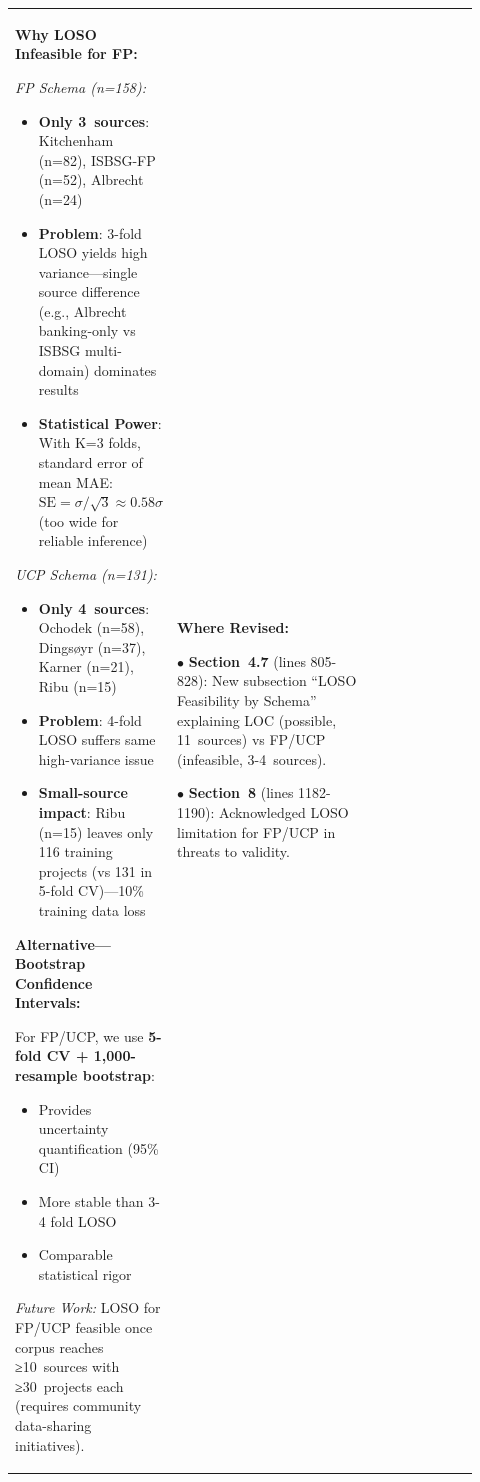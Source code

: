 \documentclass[11pt,a4paper]{article}
\begin{document}
\begin{longtable}{>{\raggedright\arraybackslash}p{0.26\linewidth}|>{\raggedright\arraybackslash}p{0.44\linewidth}|>{\raggedright\arraybackslash}p{0.22\linewidth}}
\textbf{Why LOSO Infeasible for FP:}

\textit{FP Schema (n=158):}
\begin{itemize}
    \item \textbf{Only 3~sources}: Kitchenham (n=82), ISBSG-FP (n=52), Albrecht (n=24)
    \item \textbf{Problem}: 3-fold LOSO yields high variance---single source difference (e.g., Albrecht banking-only vs ISBSG multi-domain) dominates results
    \item \textbf{Statistical Power}: With K=3 folds, standard error of mean MAE: $\text{SE} = \sigma/\sqrt{3} \approx 0.58\sigma$ (too wide for reliable inference)
\end{itemize}

\textit{UCP Schema (n=131):}
\begin{itemize}
    \item \textbf{Only 4~sources}: Ochodek (n=58), Dingsøyr (n=37), Karner (n=21), Ribu (n=15)
    \item \textbf{Problem}: 4-fold LOSO suffers same high-variance issue
    \item \textbf{Small-source impact}: Ribu (n=15) leaves only 116 training projects (vs 131 in 5-fold CV)---10\% training data loss
\end{itemize}

\textbf{Alternative---Bootstrap Confidence Intervals:}

For FP/UCP, we use \textbf{5-fold CV + 1,000-resample bootstrap}:
\begin{itemize}
    \item Provides uncertainty quantification (95\% CI)
    \item More stable than 3-4 fold LOSO
    \item Comparable statistical rigor
\end{itemize}

\textit{Future Work:} LOSO for FP/UCP feasible once corpus reaches ≥10~sources with ≥30~projects each (requires community data-sharing initiatives). &

\textbf{Where Revised:}

$\bullet$ \textbf{Section~4.7} (lines 805-828): New subsection ``LOSO Feasibility by Schema'' explaining LOC (possible, 11~sources) vs FP/UCP (infeasible, 3-4~sources).

$\bullet$ \textbf{Section~8} (lines 1182-1190): Acknowledged LOSO limitation for FP/UCP in threats to validity. \\


\end{longtable}
\end{document}
